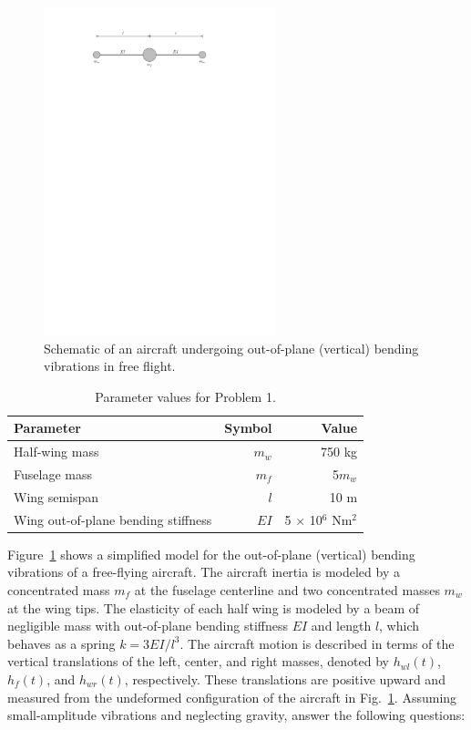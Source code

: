 \documentclass[11pt,a4paper]{article}
\begin{document}
\begin{figure}[htpt!]
	\centering
	\includegraphics[width=0.6\textwidth]{figures/aircraft.pdf}
	\caption{Schematic of an aircraft undergoing out-of-plane (vertical) bending vibrations in free flight.}
	\label{f1}
\end{figure}
%
\begin{table}[htpt!]
	\centering
	\caption{Parameter values for Problem 1. \label{t1}}
	\vspace{2mm}
	\label{tab:1}
	\begin{tabular}{lrr}
		\toprule
		Parameter & Symbol & Value \\
		\midrule 
		Half-wing mass & $m_w$ & 750 kg \\
		Fuselage mass & $m_f$ & 5$m_w$ \\
		Wing semispan & $l$ & 10 m \\
		Wing out-of-plane bending stiffness & $EI$ & 5 $\times$ 10$^{6}$ Nm$^2$ \\
		\bottomrule
	\end{tabular}
\end{table}
%
Figure~\ref{f1} shows a simplified model for the out-of-plane (vertical) bending vibrations of a free-flying aircraft. The aircraft inertia is modeled by a concentrated mass $m_f$ at the fuselage centerline and two concentrated masses $m_w$ at the wing tips. The elasticity of each half wing is modeled by a beam of negligible mass with out-of-plane bending stiffness $EI$ and length $l$, which behaves as a spring $k = 3EI/l^3$. The aircraft motion is described in terms of the vertical translations of the left, center, and right masses, denoted by $h_{wl}(t)$, $h_{f}(t)$, and $h_{wr}(t)$, respectively. These translations are positive upward and measured from the undeformed configuration of the aircraft in Fig.~\ref{f1}. Assuming small-amplitude vibrations and neglecting gravity, answer the following questions:
\end{document}
